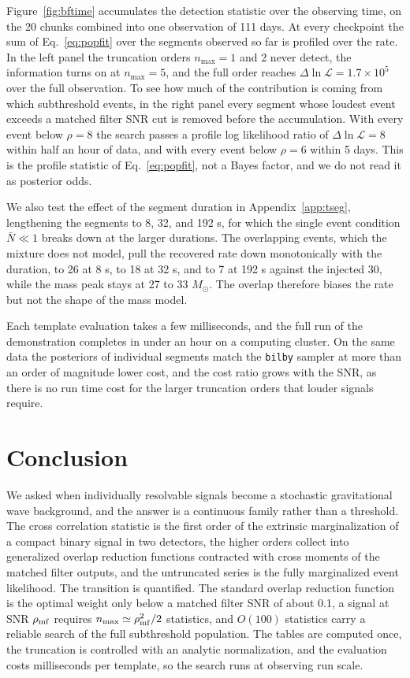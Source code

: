 \documentclass[aps,prd,twocolumn,superscriptaddress,nofootinbib]{revtex4-2}
\begin{document}
Figure~\ref{fig:bftime} accumulates the detection statistic over
the observing time, on the 20 chunks combined into one
observation of 111 days. At every checkpoint the sum of
Eq.~\eqref{eq:popfit} over the segments observed so far is
profiled over the rate. In the left panel the truncation orders
$n_{\max} = 1$ and 2 never detect, the information turns on at
$n_{\max} = 5$, and the full order reaches
$\Delta \ln \mathcal{L} = 1.7 \times 10^{5}$ over the full
observation. To see how much of the contribution is coming from which
subthreshold events, in the right panel every segment whose
loudest event exceeds a matched filter SNR cut is removed before
the accumulation. With every event below $\rho = 8$ the search
passes a profile log likelihood ratio of
$\Delta \ln \mathcal{L} = 8$ within
half an hour of data, and with every event below $\rho = 6$
within 5 days. This is the profile statistic of
Eq.~\eqref{eq:popfit}, not a Bayes factor, and we do not read it
as posterior odds.


We also test the effect of the segment duration in
Appendix~\ref{app:tseg}, lengthening the segments to 8, 32, and
192 s, for which the single event condition $\bar N \ll 1$
breaks down at the larger durations. The overlapping events, which
the mixture does not model, pull the recovered rate down
monotonically with the duration, to 26 at 8 s, to 18 at 32 s, and
to 7 at 192 s against the injected 30, while the mass peak stays
at 27 to 33 $M_\odot$. The overlap therefore biases the rate but
not the shape of the mass model.

Each template evaluation takes a few milliseconds, and the full run
of the demonstration completes in under an hour on a computing
cluster. On the same data the posteriors of individual segments match
the \texttt{bilby} sampler \cite{bilby} at more than an order of
magnitude lower cost, and the cost ratio grows with the SNR, as there is no run time cost for the larger truncation orders that louder signals require.

\FloatBarrier

\section{Conclusion}
\label{sec:conclusion}

We asked when individually resolvable signals become a stochastic
gravitational wave background, and the answer is a continuous
family rather than a threshold. The cross correlation statistic
is the first order of the extrinsic marginalization of a compact
binary signal in two detectors, the higher orders collect into
generalized overlap reduction functions contracted with cross
moments of the matched filter outputs, and the untruncated series
is the fully marginalized event likelihood. The transition is
quantified. The standard overlap reduction function is the
optimal weight only below a matched filter SNR of about 0.1, a
signal at SNR $\rho_{\rm mf}$ requires
$n_{\max} \simeq \rho_{\rm mf}^2 / 2$ statistics, and $O(100)$
statistics carry a reliable search of the full subthreshold
population. The tables are computed once, the truncation is
controlled with an analytic normalization, and the evaluation
costs milliseconds per template, so the search runs at observing
run scale.
\end{document}

